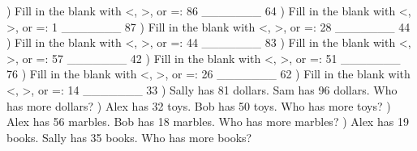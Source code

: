 \documentclass{article}%
\begin{document}
\newline%
\newline%
) Fill in the blank with <, >, or =: 86 \_\_\_\_\_\_\_ 64%
\newline%
\newline%
) Fill in the blank with <, >, or =: 1 \_\_\_\_\_\_\_ 87%
\newline%
\newline%
) Fill in the blank with <, >, or =: 28 \_\_\_\_\_\_\_ 44%
\newline%
\newline%
) Fill in the blank with <, >, or =: 44 \_\_\_\_\_\_\_ 83%
\newline%
\newline%
) Fill in the blank with <, >, or =: 57 \_\_\_\_\_\_\_ 42%
\newline%
\newline%
) Fill in the blank with <, >, or =: 51 \_\_\_\_\_\_\_ 76%
\newline%
\newline%
) Fill in the blank with <, >, or =: 26 \_\_\_\_\_\_\_ 62%
\newline%
\newline%
) Fill in the blank with <, >, or =: 14 \_\_\_\_\_\_\_ 33%
\newline%
\newline%
) Sally has 81 dollars. Sam has 96 dollars. Who has more dollars?%
\newline%
\newline%
) Alex has 32 toys. Bob has 50 toys. Who has more toys?%
\newline%
\newline%
) Alex has 56 marbles. Bob has 18 marbles. Who has more marbles?%
\newline%
\newline%
) Alex has 19 books. Sally has 35 books. Who has more books?%
\newline%
\newline%
\end{document}
